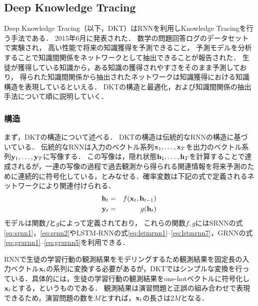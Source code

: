 \subsection{Deep Knowledge Tracing}
Deep Knowledge Tracing\cite{piech2015deep}（以下，DKT）はRNNを利用しKnowledge Tracingを行う手法である．
2015年6月に発表された．
数学の問題回答ログのデータセットで実験され，
高い性能で将来の知識獲得を予測できること，
予測モデルを分析することで知識間関係をネットワークとして抽出できることが報告された．
生徒が獲得している知識から，ある知識の獲得されやすさをそのまま予測しており，
得られた知識間関係から抽出されたネットワークは知識獲得における知識構造を表現しているといえる．
DKTの構造と最適化，および知識間関係の抽出手法について順に説明していく．



\subsubsection{構造}
まず，DKTの構造について述べる．
DKTの構造は伝統的なRNNの構造に基づいている．
伝統的なRNNは入力のベクトル系列${\bf x}_1, \dots, {\bf x}_T$を出力のベクトル系列${\bf y}_1, \dots, {\bf y}_T$に写像する．
この写像は，隠れ状態${\bf h}_1, \dots, {\bf h}_T$を計算することで達成されるが，一連の写像の過程で過去観測から得られる関連情報を将来予測のために連続的に符号化している，とみなせる．確率変数は下記の式で定義されるネットワークにより関連付けられる．
\begin{eqnarray}
\label{eq:rnn1}
{\bf h}_t &=& f({\bf x}_t, {\bf h}_{t-1})\\
\label{eq:rnn2}
{\bf y}_t &=& g({\bf h}_t)
\end{eqnarray}
モデルは関数$f$と$g$によって定義されており，
これらの関数$f, g$にはSRNNの式\ref{eq:srnn1}，\ref{eq:srnn2}やLSTM-RNNの式\ref{eq:lstmrnn1}--\ref{eq:lstmrnn7}，GRNNの式\ref{eq:grurnn1}--\ref{eq:grurnn5}を利用できる． 


RNNで生徒の学習行動の観測結果をモデリングするため観測結果を固定長の入力ベクトル${\bf x}_t$の系列に変換する必要があるが，DKTではシンプルな変換を行っている．具体的には，生徒の学習行動の観測結果をone-hotベクトルに符号化し${\bf x}_t$とする，というものである．
観測結果は演習問題と正誤の組み合わせで表現できるため，演習問題の数を$M$とすれば，${\bf x}_t$の長さは$2M$となる．


